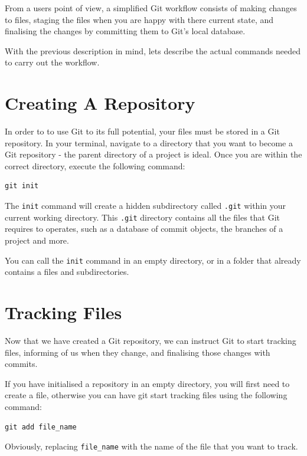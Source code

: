 \documentclass[11pt, a4paper, titlepage]{article}
\begin{document}
From a users point of view, a simplified Git workflow consists of making
changes to files, staging the files when you are happy with there current
state, and finalising the changes by committing them to Git's local database.

With the previous description in mind, lets describe the actual commands needed
to carry out the workflow.

\section{Creating A Repository}
In order to to use Git to its full potential, your files must be stored in a
Git repository.
In your terminal, navigate to a directory that you want to become a Git
repository - the parent directory of a project is ideal.
Once you are within the correct directory, execute the following command:

\begin{lstlisting}[label=lst_init,
caption=Initialising a new Git repository]
 git init 
\end{lstlisting}

The {\tt init} command will create a hidden subdirectory called {\tt .git}
within your current working directory.
This {\tt .git} directory contains all the files that Git requires to
operates, such as a database of commit objects, the branches of a project and
more.

You can call the {\tt init} command in an empty directory, or in a folder that
already contains a files and subdirectories.



\section{Tracking Files}
Now that we have created a Git repository, we can instruct Git to start
tracking files, informing of us when they change, and finalising those changes
with commits. 

If you have initialised a repository in an empty directory, you will first
need to create a file, otherwise you can have git start tracking files using
the following command:

\begin{lstlisting}[label=lst_add_file,
caption=Adding a file to the Stagging area.]
 git add file_name
\end{lstlisting}
Obviously, replacing {\tt file\_name} with the name of the file that you want
to track.
\end{document}
